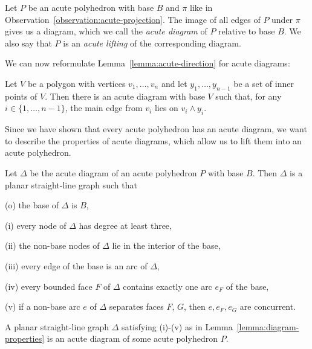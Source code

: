 \begin{definition}
  Let $P$ be an acute polyhedron with base $B$ and $\pi$ like in Observation~\ref{observation:acute-projection}.
  The image of all edges of $P$ under $\pi$ gives us a diagram, which we call the \emph{acute diagram} of $P$ relative to base $B$. 
  We also say that $P$ is an \emph{acute lifting} of the corresponding diagram.
\end{definition}

We can now reformulate Lemma~\ref{lemma:acute-direction} for acute diagrams:

\begin{corollary}\label{corollary:acute-direction}
  Let $V$ be a polygon with vertices $v_1,\dots,v_n$ and let $y_1,\dots,y_{n-1}$ be a set of inner points of $V$.
  Then there is an acute diagram with base $V$ such that, for any $i \in \{1,\dots,n-1\}$, the main edge from $v_i$ lies on $v_i \wedge y_i$.
\end{corollary}

Since we have shown that every acute polyhedron has an acute diagram, we want to describe the properties of acute diagrams, which allow us to lift them into an acute polyhedron.

\begin{lemma}\label{lemma:diagram-properties}
  Let $\Delta$ be the acute diagram of an acute polyhedron $P$ with base $B$.
  Then $\Delta$ is a planar straight-line graph such that

  (o) the base of $\Delta$ is $B$,
  
  (i) every node of $\Delta$ has degree at least three,

  (ii) the non-base nodes of $\Delta$ lie in the interior of the base,

  (iii) every edge of the base is an arc of $\Delta$,

  (iv) every bounded face $F$ of $\Delta$ contains exactly one arc $e_F$ of the base,

  (v) if a non-base arc $e$ of $\Delta$ separates faces $F$, $G$, then $e, e_F, e_G$ are concurrent.
\end{lemma}


\begin{lemma}
  A planar straight-line graph $\Delta$ satisfying (i)-(v) as in Lemma~\ref{lemma:diagram-properties} is an acute diagram of some acute polyhedron $P$.
\end{lemma}

